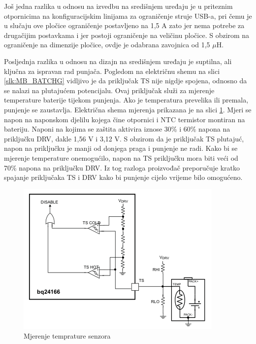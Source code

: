 Još jedna razlika u odnosu na izvedbu na središnjem uređaju je u priteznim otpornicima na konfiguracijskim linijama za ograničenje struje USB-a, pri čemu je u slučaju ove pločice ograničenje postavljeno na 1,5 A zato jer nema potrebe za drugačijim postavkama i jer postoji ograničenje na veličinu pločice. S obzirom na ograničenje na dimenzije pločice, ovdje je odabrana zavojnica od 1,5 $\mu \textrm{H}$.

Posljednja razlika u odnosu na dizajn na središnjem uređaju je suptilna, ali ključna za ispravan rad punjača. Pogledom na električnu shemu na slici \ref{slk:MB_BATCHG} vidljivo je da priključak TS nije nigdje spojena, odnosno da se nalazi na plutajućem potencijalu. Ovaj priključak služi za mjerenje temperature baterije tijekom punjenja. Ako je temperatura prevelika ili premala, punjenje se zaustavlja. Električna shema mjerenja prikazana je na slici \ref{slk:BATCHG_TS}. Mjeri se napon na naponskom djelilu kojega čine otpornici i NTC termistor montiran na bateriju. Naponi na kojima se zaštita aktivira iznose 30\% i 60\% napona na priključku DRV, dakle 1,56 V i 3,12 V. S obzirom da je priključak TS plutajuć, napon na priključku je manji od donjega praga i punjenje ne radi. Kako bi se mjerenje temperature onemogućilo, napon na TS priključku mora biti veći od 70\% napona na priključku DRV. Iz tog razloga proizvođač preporučuje kratko spajanje priključaka TS i DRV kako bi punjenje cijelo vrijeme bilo omogućeno.
\begin{figure}[htb]
    \centering
    \includegraphics[width=10 cm]{Figures/BATCHG_TS.png}
    \caption{Mjerenje temprature senzora}
    \label{slk:BATCHG_TS}
\end{figure}

